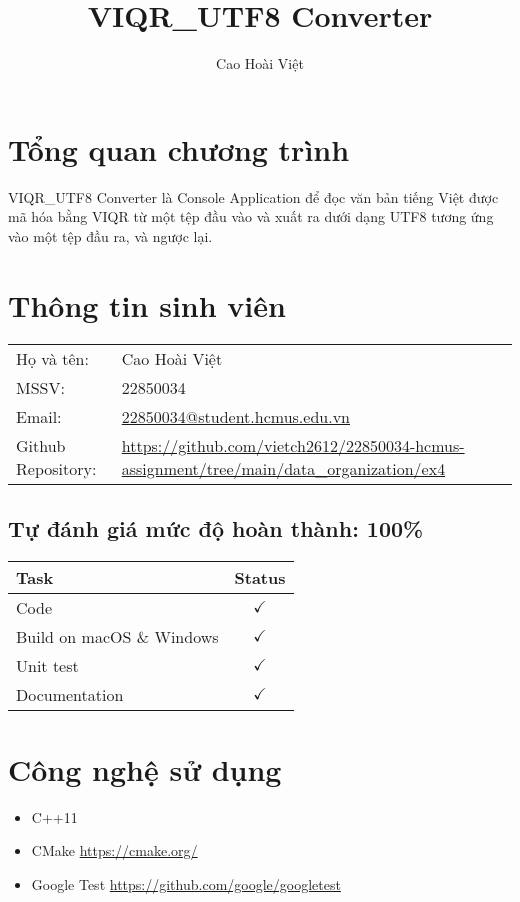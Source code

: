 \documentclass[11pt]{article}
\title{VIQR\_UTF8 Converter}
\author{Cao Hoài Việt}
\date{}
\begin{document}
\maketitle

\section*{Tổng quan chương trình}

VIQR\_UTF8 Converter là Console Application để đọc văn bản tiếng Việt được mã hóa bằng VIQR từ một tệp đầu vào và xuất ra dưới dạng UTF8 tương ứng vào một tệp đầu ra, và ngược lại.

\section*{Thông tin sinh viên}

\begin{tabular}{ll}
Họ và tên: & Cao Hoài Việt \\
MSSV: & 22850034 \\
Email: & \href{mailto:22850034@student.hcmus.edu.vn}{22850034@student.hcmus.edu.vn} \\
Github Repository: & \url{https://github.com/vietch2612/22850034-hcmus-assignment/tree/main/data_organization/ex4}
\end{tabular}

\subsection*{Tự đánh giá mức độ hoàn thành: 100\%}

\begin{tabular}{|l|c|}
\hline
Task & Status \\
\hline
Code & $\checkmark$ \\
Build on macOS \& Windows & $\checkmark$ \\
Unit test & $\checkmark$ \\
Documentation & $\checkmark$ \\
\hline
\end{tabular}

\section*{Công nghệ sử dụng}

\begin{itemize}
    \item C++11
    \item CMake \url{https://cmake.org/}
    \item Google Test \url{https://github.com/google/googletest}
\end{itemize}
\end{document}
